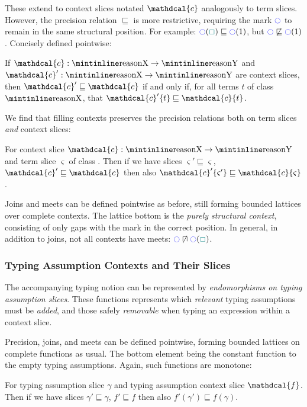 \newcommand{\Cs}{\mathdcal{c}}
\newcommand{\p}{\mathdcal{p}}
These extend to context slices notated $\Cs$ analogously to term slices. However, the precision relation $\sqsubseteq$ is more restrictive, requiring the mark $\cmark$ to remain in the same structural position. For example: $\cmark(\gap) \sqsubseteq \cmark(1)$, but $\cmark \not \sqsubseteq \cmark(1)$. Concisely defined pointwise:

\begin{definition}\label{def:ContextPrecision}
If $\Cs : \code{X} \to \code{Y}$ and $\Cs' : \code{X} \to \code{Y}$ are context slices, then $\Cs' \sqsubseteq \Cs$ if and only if, for all terms $t$ of class $\code{X}$, that $\Cs'\{t\} \sqsubseteq \Cs\{t\}$.
\end{definition}

We find that filling contexts preserves the precision relations both on term slices \textit{and} context slices:
\begin{proposition}
For context slice $\Cs : \code{X} \to \code{Y}$ and term slice $\varsigma$ of class . Then if we have slices $\varsigma' \sqsubseteq \varsigma$, $\Cs' \sqsubseteq \Cs$ then also $\Cs'\{\varsigma'\} \sqsubseteq \Cs\{\varsigma\}$.
\end{proposition}

Joins and meets can be defined pointwise as before, still forming bounded lattices over complete contexts. The lattice bottom is the \textit{purely structural context}, consisting of only gaps with the mark in the correct position. In general, in addition to joins, not all contexts have meets: $\cmark\centernot \sqcap \cmark(\gap)$.

\subsubsection{Typing Assumption Contexts and Their Slices}
The accompanying typing notion can be represented by \textit{endomorphisms on typing assumption slices}. These functions represents which \textit{relevant} typing assumptions must be \textit{added}, and those safely \textit{removable} when typing an expression within a context slice.

\renewcommand{\F}{\mathdcal{F}}
\newcommand{\f}{\mathdcal{f}}

Precision, joins, and meets can be defined pointwise, forming bounded lattices on complete functions as usual. The bottom element being the constant function to the empty typing assumptions. Again, such functions are monotone:
\begin{proposition}
For typing assumption slice $\gamma$ and typing assumption context slice $\f$. Then if we have slices $\gamma' \sqsubseteq \gamma$, $f' \sqsubseteq f$ then also $f'(\gamma') \sqsubseteq f(\gamma)$.
\end{proposition}
